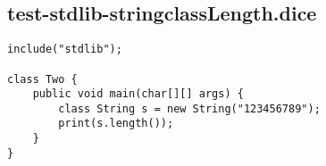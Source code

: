 \subsection{test-stdlib-stringclassLength.dice}
\begin{verbatim}
include("stdlib");

class Two {
	public void main(char[][] args) {
        class String s = new String("123456789");
        print(s.length());
	}
}

\end{verbatim}